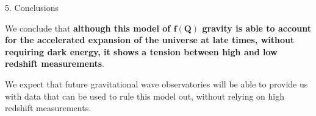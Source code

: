 \begin{block}{5. Conclusions}

We conclude that \textbf{although this model of $\boldsymbol{f(Q)}$ gravity is able to account for the accelerated expansion of the universe at late times, without requiring dark energy, it shows a tension between high and low redshift measurements}.

We expect that future gravitational wave observatories will be able to provide us with data that can be used to rule this model out, without relying on high redshift measurements.

\end{block}